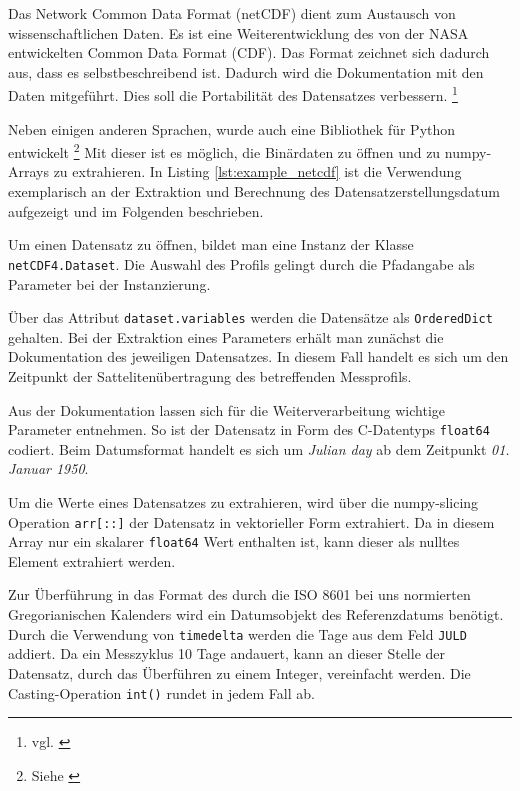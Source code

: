     Das Network Common Data Format (netCDF) dient zum Austausch von wissenschaftlichen Daten. Es ist eine Weiterentwicklung des von der NASA entwickelten Common Data Format (CDF). Das Format zeichnet sich dadurch aus, dass es selbstbeschreibend ist. Dadurch wird die Dokumentation mit den Daten mitgeführt. Dies soll die Portabilität des Datensatzes verbessern.  \footnote{vgl. \cite{FisherNetCDF}}
   
    Neben einigen anderen Sprachen, wurde auch eine Bibliothek für Python entwickelt \footnote{Siehe \cite{netCDF4}} Mit dieser ist es möglich, die Binärdaten zu öffnen und zu numpy-Arrays zu extrahieren. In Listing \ref{lst:example_netcdf} ist die Verwendung exemplarisch an der Extraktion und Berechnung des Datensatzerstellungsdatum aufgezeigt und im Folgenden beschrieben.
    
    
    Um einen Datensatz zu öffnen, bildet man eine Instanz der Klasse \texttt{netCDF4.Dataset}. Die Auswahl des Profils gelingt durch die Pfadangabe als Parameter bei der Instanzierung.
    
    Über das Attribut \texttt{dataset.variables} werden die Datensätze als \texttt{OrderedDict} gehalten. Bei der Extraktion eines Parameters erhält man zunächst die Dokumentation des jeweiligen Datensatzes. In diesem Fall handelt es sich um den Zeitpunkt der Sattelitenübertragung des betreffenden Messprofils.
    
    Aus der Dokumentation lassen sich für die Weiterverarbeitung wichtige Parameter entnehmen.
    So ist der Datensatz in Form des C-Datentyps \texttt{float64} codiert. Beim Datumsformat handelt es sich um \textit{Julian day} ab dem Zeitpunkt \textit{01. Januar 1950}.
    
    Um die Werte eines Datensatzes zu extrahieren, wird über die numpy-slicing Operation \texttt{arr[::]} der Datensatz in vektorieller Form extrahiert. Da in diesem Array nur ein skalarer \texttt{float64} Wert enthalten ist, kann dieser als nulltes Element extrahiert werden.
    
    Zur Überführung in das Format des durch die ISO 8601 bei uns normierten Gregorianischen Kalenders wird ein Datumsobjekt des Referenzdatums benötigt. Durch die Verwendung von \texttt{timedelta} werden die Tage aus dem Feld \texttt{JULD} addiert. Da ein Messzyklus 10 Tage andauert, kann an dieser Stelle der Datensatz, durch das Überführen zu einem Integer, vereinfacht werden. Die Casting-Operation \texttt{int()} rundet in jedem Fall ab.
    


        

 
   
